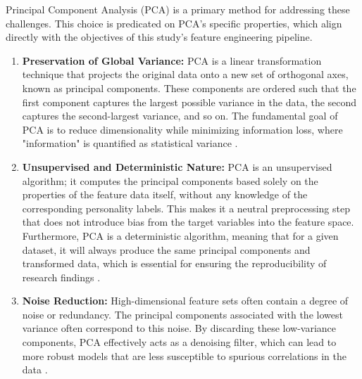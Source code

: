 Principal Component Analysis (PCA) is a primary method for addressing these challenges. This choice is predicated on PCA's specific properties, which align directly with the objectives of this study's feature engineering pipeline.
\begin{enumerate}
	\item \textbf{Preservation of Global Variance:} PCA is a linear transformation technique that projects the original data onto a new set of orthogonal axes, known as principal components. These components are ordered such that the first component captures the largest possible variance in the data, the second captures the second-largest variance, and so on. The fundamental goal of PCA is to reduce dimensionality while minimizing information loss, where "information" is quantified as statistical variance \citep{jolliffe2016}.
	
	\item \textbf{Unsupervised and Deterministic Nature:} PCA is an unsupervised algorithm; it computes the principal components based solely on the properties of the feature data itself, without any knowledge of the corresponding personality labels. This makes it a neutral preprocessing step that does not introduce bias from the target variables into the feature space. Furthermore, PCA is a deterministic algorithm, meaning that for a given dataset, it will always produce the same principal components and transformed data, which is essential for ensuring the reproducibility of research findings \citep{wold1987}.
	
	\item \textbf{Noise Reduction:} High-dimensional feature sets often contain a degree of noise or redundancy. The principal components associated with the lowest variance often correspond to this noise. By discarding these low-variance components, PCA effectively acts as a denoising filter, which can lead to more robust models that are less susceptible to spurious correlations in the data \citep{hastie2009}.
\end{enumerate}